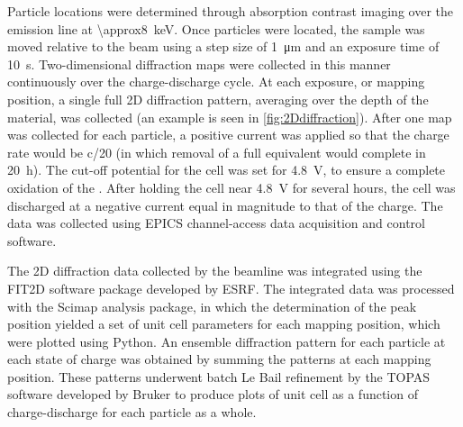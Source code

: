 \documentclass{article}
\begin{document}
Particle locations were determined through absorption contrast imaging
over the  emission line at
\SI{\approx8}{\kilo\electronvolt}. Once particles were located, the
sample was moved relative to the beam using a step size of
\SI{1}{\micro\meter} and an exposure time of
\SI{10}{\second}. Two-dimensional diffraction maps were collected in
this manner continuously over the charge-discharge cycle. At each
exposure, or mapping position, a single full 2D diffraction pattern,
averaging over the depth of the material, was collected (an example is
seen in \ref{fig:2Ddiffraction}). After one map was collected for each
particle, a positive current was applied so that the charge rate would
be c/20 (in which removal of a full  equivalent would complete
in \SI{20}{\hour}). The cut-off potential for the cell was set for
\SI{4.8}{\volt}, to ensure a complete oxidation of the \nca{}. After
holding the cell near \SI{4.8}{\volt} for several hours, the cell was
discharged at a negative current equal in magnitude to that of the
charge. The data was collected using EPICS channel-access data
acquisition and control software.

The 2D diffraction data collected by the beamline was integrated using
the FIT2D software package developed by
ESRF\cite{hausermann1996,hammersley1997}. The integrated data was
processed with the Scimap analysis package\cite{scimap}, in which the
determination of the peak position yielded a set of unit cell
parameters for each mapping position, which were plotted using
Python. An ensemble diffraction pattern for each particle at each
state of charge was obtained by summing the patterns at each mapping
position. These patterns underwent batch Le Bail refinement by the
TOPAS software developed by Bruker to produce plots of unit cell as a
function of charge-discharge for each particle as a whole.
\end{document}
